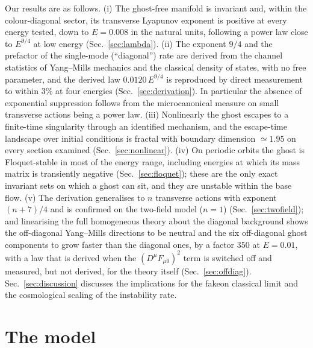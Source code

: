 \documentclass[11pt,a4paper]{article}
\begin{document}
Our results are as follows. (i) The ghost-free manifold is invariant and, within the
colour-diagonal sector, its transverse Lyapunov exponent is positive at every energy tested, down
to $E=0.008$ in the natural units, following a power law close to $E^{9/4}$ at low energy
(Sec.~\ref{sec:lambda}). (ii) The exponent $9/4$ and the prefactor of the single-mode
(``diagonal'') rate are derived from the channel statistics of Yang--Mills mechanics and the
classical density of states, with no free parameter, and the derived law
$0.0120\,E^{9/4}$ is reproduced by direct measurement to within $3\%$ at four energies
(Sec.~\ref{sec:derivation}). In particular the absence of exponential suppression follows from the
microcanonical measure on small transverse actions being a power law. (iii) Nonlinearly the ghost
escapes to a finite-time singularity through an identified mechanism, and the escape-time
landscape over initial conditions is fractal with boundary dimension $\simeq1.95$ on every
section examined (Sec.~\ref{sec:nonlinear}). (iv) On periodic orbits the ghost is Floquet-stable
in most of the energy range, including energies at which its mass matrix is transiently negative
(Sec.~\ref{sec:floquet}); these are the only exact invariant sets on which a ghost can sit, and
they are unstable within the base flow. (v) The derivation generalises to $n$ transverse actions
with exponent $(n+7)/4$ and is confirmed on the two-field model ($n=1$)
(Sec.~\ref{sec:twofield}); and linearising the full homogeneous theory about the diagonal
background shows the off-diagonal Yang--Mills directions to be neutral and the six off-diagonal
ghost components to grow faster than the diagonal ones, by a factor $350$ at $E=0.01$, with a
law that is derived when the $(D^\mu F_{\mu0})^2$ term is switched off and measured, but not
derived, for the theory itself (Sec.~\ref{sec:offdiag}). Sec.~\ref{sec:discussion} discusses the
implications for the fakeon classical limit and the cosmological scaling of the instability rate.

\section{The model}
\label{sec:model}
\end{document}
